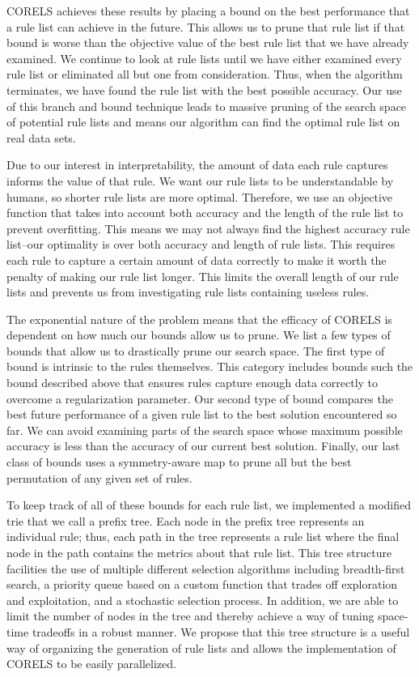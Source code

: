 \documentclass[]{article}
\theoremstyle{definition}
\begin{document}
CORELS achieves these results by placing a bound on the best performance that a rule list can achieve in the future. 
This allows us to prune that rule list if that bound is worse than the objective value of the best rule list that we have already examined.
We continue to look at rule lists until we have either examined every rule list or eliminated all but one from consideration. 
Thus, when the algorithm terminates, we have found the rule list with the best possible accuracy. 
Our use of this branch and bound technique leads to massive pruning of the search space of potential rule lists and means our algorithm can find the optimal rule list on real data sets.

Due to our interest in interpretability, the amount of data each rule captures informs the value of that rule. 
We want our rule lists to be understandable by humans, so shorter rule lists are more optimal. 
Therefore, we use an objective function that takes into account both accuracy and the length of the rule list to prevent overfitting. 
This means we may not always find the highest accuracy rule list--our optimality is over both accuracy and length of rule lists.
This requires each rule to capture a certain amount of data correctly to make it worth the penalty of making our rule list longer. 
This limits the overall length of our rule lists and prevents us from investigating rule lists containing useless rules.

The exponential nature of the problem means that the efficacy of CORELS is dependent on how much our bounds allow us to prune. 
We list a few types of bounds that allow us to drastically prune our search space. 
The first type of bound is intrinsic to the rules themselves. 
This category includes bounds such the bound described above that ensures rules capture enough data correctly to overcome a regularization parameter. 
Our second type of bound compares the best future performance of a given rule list to the best solution encountered so far. 
We can avoid examining parts of the search space whose maximum possible accuracy is less than the accuracy of our current best solution. 
Finally, our last class of bounds uses a symmetry-aware map to prune all but the best permutation of any given set of rules.

To keep track of all of these bounds for each rule list, we implemented a modified trie that we call a prefix tree. 
Each node in the prefix tree represents an individual rule; thus, each path in the tree represents a rule list where the final node in the path contains the metrics about that rule list.
This tree structure facilities the use of multiple different selection algorithms including breadth-first search, a priority queue based on a custom function that trades off exploration and exploitation, and a stochastic selection process. 
In addition, we are able to limit the number of nodes in the tree and thereby achieve a way of tuning space-time tradeoffs in a robust manner. 
We propose that this tree structure is a useful way of organizing the generation of rule lists and allows the implementation of CORELS to be easily parallelized.
\end{document}
